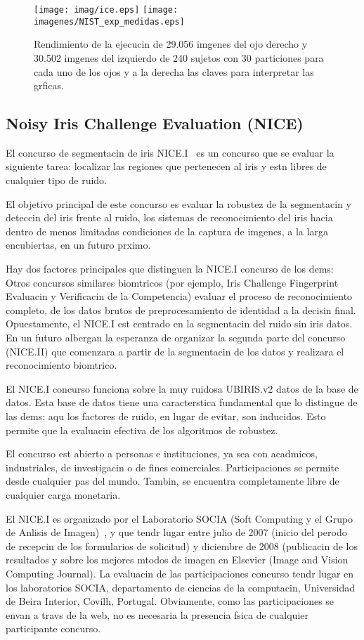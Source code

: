 \begin{figure}[h!]
  \centerline{
    \mbox{\texttt{[image: imag/ice.eps]}}
    \mbox{\texttt{[image: imagenes/NIST\_exp\_medidas.eps]}}
  }
  \caption{Rendimiento de la ejecucin de 29.056 imgenes del ojo derecho y 30.502 imgenes del izquierdo de 240 sujetos con 30 particiones para cada uno de los ojos y a la derecha las claves para interpretar las grficas.}
  \label{fig:grafica_ice2006}
\end{figure}

\subsection{Noisy Iris Challenge Evaluation (NICE)}
El concurso de segmentacin de iris NICE.I~\cite{web:NICE} es un concurso que se evaluar la siguiente tarea: localizar las regiones que pertenecen al iris y estn libres de cualquier tipo de ruido.

El objetivo principal de este concurso es evaluar la robustez de la segmentacin y deteccin del iris frente al ruido, los sistemas de reconocimiento del iris hacia dentro de menos limitadas condiciones de la captura de imgenes, a la larga encubiertas, en un futuro prximo.

Hay dos factores principales que distinguen la NICE.I concurso de los dems:
Otros concursos similares biomtricos (por ejemplo, Iris Challenge Fingerprint Evaluacin y Verificacin de la Competencia) evaluar el proceso de reconocimiento completo, de los datos brutos de preprocesamiento de identidad a la decisin final. Opuestamente, el NICE.I est centrado en la segmentacin del ruido sin iris datos. En un futuro albergan la esperanza de organizar la segunda parte del concurso (NICE.II) que comenzara a partir de la segmentacin de los datos y realizara el reconocimiento biomtrico.

El NICE.I concurso funciona sobre la muy ruidosa UBIRIS.v2 datos de la base de datos. Esta base de datos tiene una caracterstica fundamental que lo distingue de las dems: aqu los factores de ruido, en lugar de evitar, son inducidos. Esto permite que la evaluacin efectiva de los algoritmos de robustez.

El concurso est abierto a personas e instituciones, ya sea con acadmicos, industriales, de investigacin o de fines comerciales. Participaciones se permite desde cualquier pas del mundo. Tambin, se encuentra completamente libre de cualquier carga monetaria.

El NICE.I es organizado por el Laboratorio SOCIA (Soft Computing y el Grupo de Anlisis de Imagen)~\cite{web:SociaLAB}, y que tendr lugar entre julio de 2007 (inicio del perodo de recepcin de los formularios de solicitud) y diciembre de 2008 (publicacin de los resultados y sobre los mejores mtodos de imagen en Elsevier (Image and Vision Computing Journal). La evaluacin de las participaciones concurso tendr lugar en los laboratorios SOCIA, departamento de ciencias de la computacin, Universidad de Beira Interior, Covilh, Portugal. Obviamente, como las participaciones se envan a travs de la web, no es necesaria la presencia fsica de cualquier participante concurso.


\newpage \thispagestyle{empty} %